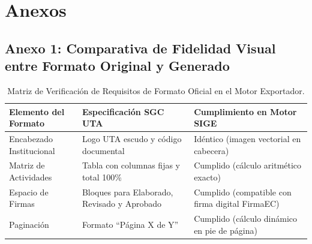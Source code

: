 \documentclass[12pt,a4paper]{article}
\begin{document}
\vspace{0.4cm}

\section{Anexos}

\subsection*{Anexo 1: Comparativa de Fidelidad Visual entre Formato Original y Generado}
\begin{table}[H]
\centering
\small
\begin{tabularx}{\textwidth}{|l|l|X|}
\hline
\rowcolor{tableheader}
\textbf{Elemento del Formato} & \textbf{Especificación SGC UTA} & \textbf{Cumplimiento en Motor SIGE} \\ \hline
Encabezado Institucional & Logo UTA escudo y código documental & Idéntico (imagen vectorial en cabecera) \\ \hline
Matriz de Actividades & Tabla con columnas fijas y total 100\% & Cumplido (cálculo aritmético exacto) \\ \hline
Espacio de Firmas & Bloques para Elaborado, Revisado y Aprobado & Cumplido (compatible con firma digital FirmaEC) \\ \hline
Paginación & Formato ``Página X de Y'' & Cumplido (cálculo dinámico en pie de página) \\ \hline
\end{tabularx}
\caption{Matriz de Verificación de Requisitos de Formato Oficial en el Motor Exportador.}
\label{tab:cumplimiento_formato}
\end{table}
\end{document}
